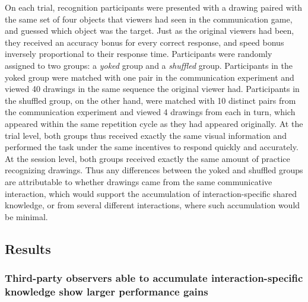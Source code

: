 \documentclass[10pt,letterpaper]{article}
\begin{document}
On each trial, recognition participants were presented with a drawing paired with the same set of four objects that viewers had seen in the communication game, and guessed which object was the target. 
Just as the original viewers had been, they received an accuracy bonus for every correct response, and speed bonus inversely proportional to their response time. 
Participants were randomly assigned to two groups: a \textit{yoked} group and a \textit{shuffled} group. 
Participants in the yoked group were matched with one pair in the communication experiment and viewed 40 drawings in the same sequence the original viewer had. 
Participants in the shuffled group, on the other hand, were matched with 10 distinct pairs from the communication experiment and viewed 4 drawings from each in turn, which appeared within the same repetition cycle as they had appeared originally. 
At the trial level, both groups thus received exactly the same visual information and performed the task under the same incentives to respond quickly and accurately. 
At the session level, both groups received exactly the same amount of practice recognizing drawings.
Thus any differences between the yoked and shuffled groups are attributable to whether drawings came from the same communicative interaction, which would support the accumulation of interaction-specific shared knowledge, or from several different interactions, where such accumulation would be minimal.

\subsection{Results}

\subsubsection{Third-party observers able to accumulate interaction-specific knowledge show larger performance gains}


\end{document}
